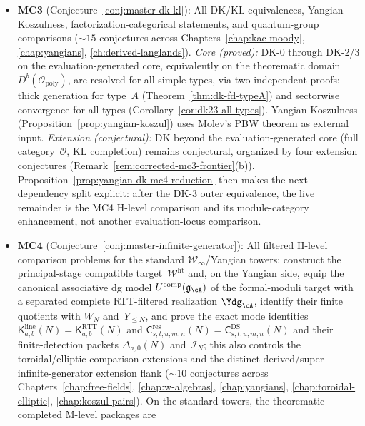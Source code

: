 \begin{remark}
\begin{itemize}
  conjectures across Chapters~\ref{chap:higher-genus},
  \ref{chap:deformation-theory}, \ref{ch:genus-expansions}).
\item \textbf{MC3} (Conjecture~\ref{conj:master-dk-kl}):
  All DK/KL equivalences, Yangian Koszulness, factorization-categorical
  statements, and quantum-group comparisons (${\sim}15$ conjectures
  across Chapters~\ref{chap:kac-moody}, \ref{chap:yangians},
  \ref{ch:derived-langlands}).
  \emph{Core (proved):} DK-0 through DK-2/3 on the
  evaluation-generated core, equivalently on the theorematic domain
  $D^b(\mathcal{O}_{\mathrm{poly}})$, are resolved for all simple
  types, via two independent proofs: thick generation for
  type~$A$ (Theorem~\ref{thm:dk-fd-typeA}) and sectorwise
  convergence for all types
  (Corollary~\ref{cor:dk23-all-types}).
  Yangian Koszulness (Proposition~\ref{prop:yangian-koszul})
  uses Molev's PBW theorem \cite{molev-yangians} as external input.
  \emph{Extension (conjectural):} DK beyond the evaluation-generated
  core (full category~$\mathcal{O}$, KL completion) remains conjectural,
  organized by four extension conjectures
  (Remark~\ref{rem:corrected-mc3-frontier}(b)).
  Proposition~\ref{prop:yangian-dk-mc4-reduction}
  then makes the next dependency split explicit: after the DK-3 outer
  equivalence, the live remainder is the MC4 H-level comparison and its
  module-category enhancement, not another evaluation-locus
  comparison.
\item \textbf{MC4} (Conjecture~\ref{conj:master-infinite-generator}):
  All filtered H-level comparison problems for the standard
  $\mathcal{W}_\infty$/Yangian towers: construct the principal-stage
  compatible target~$\mathcal{W}^{\mathrm{ht}}$ and, on the Yangian
  side, equip the canonical associative dg model
  $U^{\mathrm{comp}}(\mathfrak{g}_{\cA})$ of the formal-moduli target
  with a separated complete RTT-filtered realization
  $\Ydg_{\cA}$, identify their finite quotients with $W_N$
  and~$Y_{\le N}$, and prove the exact mode
  identities
  $\mathsf{K}^{\mathrm{line}}_{a,b}(N)
  =\mathsf{K}^{\mathrm{RTT}}_{a,b}(N)$ and
  $\mathsf{C}^{\mathrm{res}}_{s,t;u;m,n}(N)
  =\mathsf{C}^{\mathrm{DS}}_{s,t;u;m,n}(N)$
  and their finite-detection packets
  $\Delta_{a,0}(N)$ and~$\mathcal{I}_N$; this also controls the
  toroidal/elliptic comparison extensions and the distinct
  derived/super infinite-generator extension flank
  (${\sim}10$ conjectures across Chapters~\ref{chap:free-fields},
  \ref{chap:w-algebras}, \ref{chap:yangians},
  \ref{chap:toroidal-elliptic}, \ref{chap:koszul-pairs}).  On the
  standard towers, the theorematic completed M-level packages are

\end{itemize}
\end{remark}
